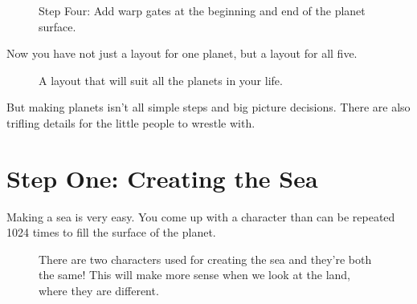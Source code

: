 \begin{figure}[H]
  {
    \begin{adjustbox}{width=10cm,center}
    \end{adjustbox}
  }\caption[]{Step Four: Add warp gates at the beginning and end of the planet surface.}
\end{figure}

Now you have not just a layout for one planet, but a layout for all five.

\begin{figure}[H]
  {
      \begin{subfigure}{0.4\textwidth}
      \end{subfigure}
      \begin{subfigure}{0.4\textwidth}
      \end{subfigure}
      \begin{subfigure}{0.4\textwidth}
      \end{subfigure}
      \hspace{2.75cm}
      \begin{subfigure}{0.4\textwidth}
      \end{subfigure}
  }\caption[]{A layout that will suit all the planets in your life.}
\end{figure}

But making planets isn't all simple steps and big picture decisions. There are also
trifling details for the little people to wrestle with.

\section{Step One: Creating the Sea}

Making a sea is very easy. You come up with a character than can be repeated 1024 times to fill the
surface of the planet.

\begin{figure}[H]
{
  \setlength{\tabcolsep}{3.0pt}
  \setlength\cmidrulewidth{\heavyrulewidth} %
    \begin{adjustbox}{width=10cm,center}
  \begin{subfigure}{0.3\textwidth}
  
  \end{subfigure}
  \begin{subfigure}{0.3\textwidth}
  
  \end{subfigure}
  \end{adjustbox}
}\caption[]{There are two characters used for creating the sea and they're both the same! This will make more sense when
we look at the land, where they are different.}
\end{figure}


